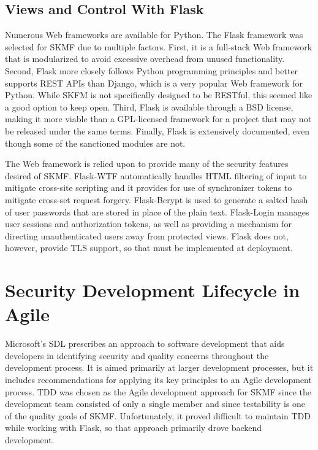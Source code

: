 \subsection{Views and Control With Flask}
\label{method:flask}

Numerous Web frameworks are available for Python. The Flask framework was selected for SKMF due to multiple factors. First, it is a full-stack Web framework that is modularized to avoid excessive overhead from unused functionality. Second, Flask more closely follows Python programming principles and better supports REST APIs than Django, which is a very popular Web framework for Python. While SKFM is not specifically designed to be RESTful, this seemed like a good option to keep open. Third, Flask is available through a BSD license, making it more viable than a GPL-licensed framework for a project that may not be released under the same terms. Finally, Flask is extensively documented, even though some of the sanctioned modules are not.

The Web framework is relied upon to provide many of the security features desired of SKMF. Flask-WTF automatically handles HTML filtering of input to mitigate cross-site scripting and it provides for use of synchronizer tokens to mitigate cross-set request forgery. Flask-Bcrypt is used to generate a salted hash of user passwords that are stored in place of the plain text. Flask-Login manages user sessions and authorization tokens, as well as providing a mechanism for directing unauthenticated users away from protected views. Flask does not, however, provide TLS support, so that must be implemented at deployment.


\section{Security Development Lifecycle in Agile}
\label{method:sdl}

Microsoft's SDL prescribes an approach to software development that aids developers in identifying security and quality concerns throughout the development process. It is aimed primarily at larger development processes, but it includes recommendations for applying its key principles to an Agile development process. TDD was chosen as the Agile development approach for SKMF since the development team consisted of only a single member and since testability is one of the quality goals of SKMF. Unfortunately, it proved difficult to maintain TDD while working with Flask, so that approach primarily drove backend development.


